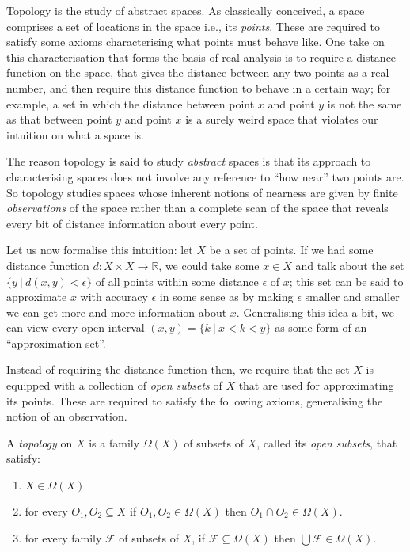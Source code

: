 \documentclass{article}
\begin{document}
Topology is the study of abstract spaces. As classically conceived, a space comprises a
set of locations in the space i.e., its \emph{points}. These are required to satisfy some
axioms characterising what points must behave like. One take on this characterisation that
forms the basis of real analysis is to require a distance function on the space, that
gives the distance between any two points as a real number, and then require this distance
function to behave in a certain way; for example, a set in which the distance between
point $x$ and point $y$ is not the same as that between point $y$ and point $x$ is a
surely weird space that violates our intuition on what a space is.

The reason topology is said to study \emph{abstract} spaces is that its approach to
characterising spaces does not involve any reference to ``how near'' two points are. So
topology studies spaces whose inherent notions of nearness are given by finite
\emph{observations} of the space rather than a complete scan of the space that reveals
every bit of distance information about every point.

Let us now formalise this intuition: let $X$ be a set of points. If we had some distance
function $d : X \times X \rightarrow \mathbb{R}$, we could take some $x \in X$ and talk about the set $\{
y\ |\ d(x, y) < \epsilon \}$ of all points within some distance $\epsilon$ of $x$; this set can be said
to approximate $x$ with accuracy $\epsilon$ in some sense as by making $\epsilon$ smaller and smaller we
can get more and more information about $x$. Generalising this idea a bit, we can view
every open interval $(x, y) = \{ k\ |\ x < k < y \}$ as some form of an ``approximation set''.

Instead of requiring the distance function then, we require that the set $X$ is equipped
with a collection of \emph{open subsets} of $X$ that are used for approximating its
points. These are required to satisfy the following axioms, generalising the notion of an
observation.

A \emph{topology} on $X$ is a family $\Omega(X)$ of subsets of $X$, called its
\emph{open subsets}, that satisfy:
\begin{enumerate}
  \item $X \in \Omega(X)$
  \item for every $O_1, O_2 \subseteq X$ if $O_1, O_2 \in \Omega(X)$ then $O_1 \cap O_2 \in \Omega(X)$.
  \item for every family $\mathcal{F}$ of subsets of $X$, if $\mathcal{F} \subseteq \Omega(X)$ then
    $\bigcup \mathcal{F} \in \Omega(X)$.
\end{enumerate}
\end{document}
